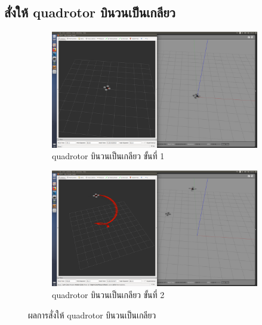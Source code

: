 \subsection{สั่งให้ quadrotor บินวนเป็นเกลียว}
\begin{figure}[!ht]
    \centering
    \begin{subfigure}[b]{0.67\textwidth}
        \centering
        \includegraphics[width=\textwidth]{images/test/circle1.png}
        \caption{quadrotor บินวนเป็นเกลียว ขั้นที่ 1}
    \end{subfigure}
    \hfill
    \begin{subfigure}[b]{0.67\textwidth}
        \centering
        \includegraphics[width=\textwidth]{images/test/circle2.png}
        \caption{quadrotor บินวนเป็นเกลียว ขั้นที่ 2}
    \end{subfigure}
    \caption{ผลการสั่งให้ quadrotor บินวนเป็นเกลียว}
\end{figure}

\clearpage
